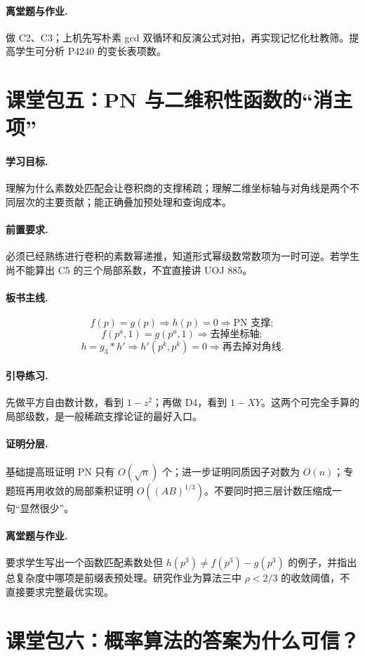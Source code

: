 \documentclass[UTF8,a4paper,11pt,oneside,openany,fontset=fandol]{ctexbook}
\theoremstyle{definition}
\begin{document}
\paragraph{离堂题与作业.} 做 C2、C3；上机先写朴素 gcd 双循环和反演公式对拍，再实现记忆化杜教筛。提高学生可分析 P4240 的变长表项数。

\section{课堂包五：PN 与二维积性函数的“消主项”}
\paragraph{学习目标.} 理解为什么素数处匹配会让卷积商的支撑稀疏；理解二维坐标轴与对角线是两个不同层次的主要贡献；能正确叠加预处理和查询成本。
\paragraph{前置要求.} 必须已经熟练进行卷积的素数幂递推，知道形式幂级数常数项为一时可逆。若学生尚不能算出 C5 的三个局部系数，不宜直接讲 UOJ 885。
\paragraph{板书主线.}
\[
 f(p)=g(p)\Rightarrow h(p)=0\Rightarrow\text{PN 支撑};
\]
\[
 f(p^a,1)=g(p^a,1)\Rightarrow\text{去掉坐标轴};
\]
\[
 h=g_3*h'\Rightarrow h'(p^k,p^k)=0\Rightarrow\text{再去掉对角线}.
\]
\paragraph{引导练习.} 先做平方自由数计数，看到 $1-z^2$；再做 D4，看到 $1-XY$。这两个可完全手算的局部级数，是一般稀疏支撑论证的最好入口。
\paragraph{证明分层.} 基础提高班证明 PN 只有 $O(\sqrt n)$ 个；进一步证明同质因子对数为 $O(n)$；专题班再用收敛的局部乘积证明 $O((AB)^{1/3})$。不要同时把三层计数压缩成一句“显然很少”。
\paragraph{离堂题与作业.} 要求学生写出一个函数匹配素数处但 $h(p^3)\ne f(p^3)-g(p^3)$ 的例子，并指出总复杂度中哪项是前缀表预处理。研究作业为算法三中 $\rho<2/3$ 的收敛阈值，不直接要求完整最优实现。

\section{课堂包六：概率算法的答案为什么可信？}
\end{document}
